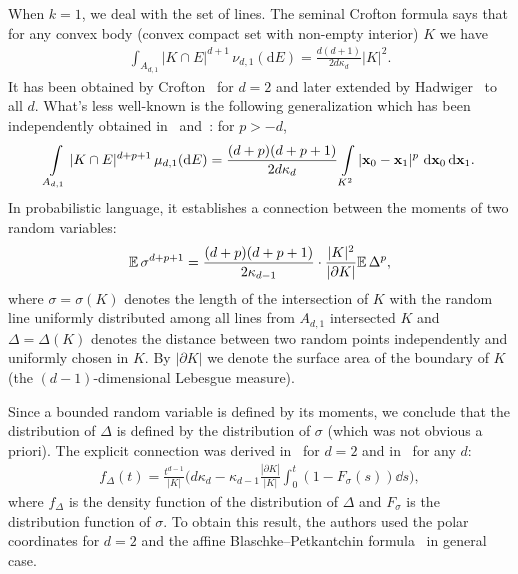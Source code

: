 \documentclass[12pt, reqno]{amsart}
\begin{document}
When $k=1$, we deal with the set of lines. The seminal Crofton formula says that for any convex body (convex compact set with non-empty interior) $K$ we have
\begin{align*}
    \int_{A_{d,1}} |K\cap E|^{d+1}\,\nu_{d,1}(\mathrm{d}E)=\frac{d(d+1)}{2d\kappa_d}|K|^2.
\end{align*}
It has been obtained by Crofton~\cite{mC85} for $d=2$ and later extended by Hadwiger~\cite{hH52} to all $d$.
What's less well-known is the following generalization which  has been  independently obtained in~\cite[Eq.~(21)]{gC67} and~\cite[Eq.~(34)]{jK69}: for $p>-d$,
\begin{align*}
    \int\limits_{A_{d,1}}|K\cap E|^{d+p+1}\,\mu_{d,1}(\mathrm{d}E)=\frac{(d+p)(d+p+1)}{2d\kappa_d}\int\limits_{K^2}{|\mathbf{x}_0-\mathbf{x}_1|^p\,{\,\rm d}\mathbf{x}_0{\,\rm d}\mathbf{x}_1}.
\end{align*}
In probabilistic language, it establishes a connection between the moments of two random variables:
\begin{align*}
    \mathbb E\, \sigma^{d+p+1}=\frac{(d+p)(d+p+1)}{2\kappa_{d-1}}\cdot\frac{|K|^2}{|\partial K|}\mathbb E\,\Delta^p,
\end{align*}
where $\sigma=\sigma(K)$ denotes the length of the intersection of $K$ with the random line uniformly distributed among all lines from $A_{d,1}$ intersected $K$ and $\Delta=\Delta(K)$ denotes the distance between two random points independently and uniformly chosen in $K$. By $|\partial K|$ we denote the surface area of the boundary of $K$ (the $(d-1)$-dimensional Lebesgue measure).

Since a bounded random variable is defined by its moments, we conclude that the distribution of $\Delta$ is defined by the distribution of $\sigma$ (which was not obvious a priori). The explicit connection was derived in~\cite{AO16} for $d=2$ and in~\cite{tM19} for any $d$:
\begin{align}\label{1109}
    f_\Delta(t)=\frac{t^{d-1}}{|K|}\bigg(d\kappa_d-\kappa_{d-1}\frac{|\partial K|}{|K|}\int_0^t(1-F_\sigma(s))\dd s\bigg),
\end{align}
where $f_\Delta$ is the density function of the distribution of $\Delta$ and $F_\sigma$ is the distribution function of $\sigma$. To obtain this result, the authors used the polar coordinates for $d=2$ and the affine Blaschke--Petkantchin formula~\cite[Theorem~7.2.7]{SW08} in general case. 

\medskip
\end{document}
